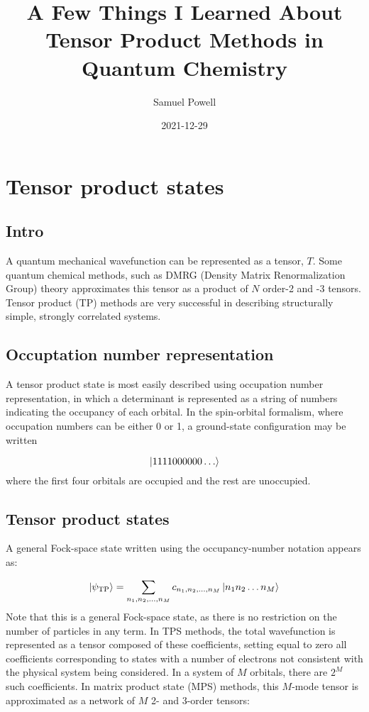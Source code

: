 \documentclass[11pt]{article} %
\title{A Few Things I Learned About Tensor Product Methods in Quantum Chemistry}
\author{Samuel Powell}
\date{2021-12-29} %
\begin{document}
\maketitle

\section{Tensor product states}

\subsection{Intro}
A quantum mechanical wavefunction can be represented as a tensor, $T$. Some quantum chemical methods, such as 
DMRG (Density Matrix Renormalization Group) theory approximates this tensor as a product of $N$ order-2 and -3 tensors.
Tensor product (TP) methods are very successful in describing structurally simple, 
strongly correlated systems.

\subsection{Occuptation number representation}
A tensor product state is most easily described using occupation number representation, in which
a determinant is represented as a string of numbers indicating the occupancy of each orbital. 
In the spin-orbital formalism, where occupation numbers can be either 0 or 1, a ground-state 
configuration may be written

\begin{equation}
    \ket{1111000000\dots}
\end{equation}
where the first four orbitals are occupied and the rest are unoccupied. 

\subsection{Tensor product states}
A general Fock-space state written using the occupancy-number notation appears as:

\begin{equation} \label{mps_state}
    \ket{\psi_{\text{TP}}} = \sum_{n_1,n_2,\dots,n_M}c_{n_1,n_2,\dots,n_M} \ket{n_1n_2\dots n_M} 
\end{equation}
Note that this is a general Fock-space state, as there is no restriction on the number of particles in any term. 
In TPS methods, the total wavefunction is represented as a tensor composed 
of these coefficients, setting equal to zero all coefficients
corresponding to states with a number of electrons not consistent with the physical system being considered. 
In a system of $M$ orbitals, there are $2^M$ such coefficients. 
In matrix product state (MPS) methods, this $M$-mode tensor is approximated as a 
network of $M$ 2- and 3-order tensors:
\end{document}
